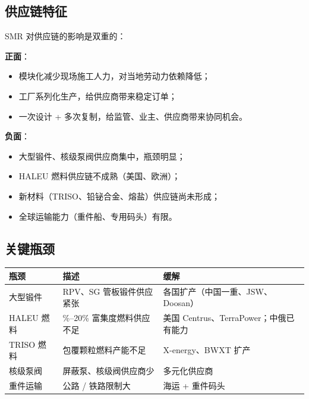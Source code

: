 \documentclass[
  UTF8,
  scheme=plain,
  fontsize=10pt,
  openany
]{ctexbook}
\begin{document}
\subsection{供应链特征}\label{ux4f9bux5e94ux94feux7279ux5f81}

SMR 对供应链的影响是双重的：

\textbf{正面}：

\begin{itemize}
\tightlist
\item
  模块化减少现场施工人力，对当地劳动力依赖降低；
\item
  工厂系列化生产，给供应商带来稳定订单；
\item
  一次设计 + 多次复制，给监管、业主、供应商带来协同机会。
\end{itemize}

\textbf{负面}：

\begin{itemize}
\tightlist
\item
  大型锻件、核级泵阀供应商集中，瓶颈明显；
\item
  HALEU 燃料供应链不成熟（美国、欧洲）；
\item
  新材料（TRISO、铅铋合金、熔盐）供应链尚未形成；
\item
  全球运输能力（重件船、专用码头）有限。
\end{itemize}

\subsection{关键瓶颈}\label{ux5173ux952eux74f6ux9888}

{\def\LTcaptype{none} %
\begin{longtable}[]{@{}
  >{\raggedright\arraybackslash}p{}
  >{\raggedright\arraybackslash}p{}
  >{\raggedright\arraybackslash}p{}@{}}
\toprule\noalign{}
\begin{minipage}[b]{\linewidth}\raggedright
瓶颈
\end{minipage} & \begin{minipage}[b]{\linewidth}\raggedright
描述
\end{minipage} & \begin{minipage}[b]{\linewidth}\raggedright
缓解
\end{minipage} \\
\midrule\noalign{}
\endhead
\bottomrule\noalign{}
\endlastfoot
大型锻件 & RPV、SG 管板锻件供应紧张 &
各国扩产（中国一重、JSW、Doosan） \\
HALEU 燃料 & 5\%--20\% 富集度燃料供应不足 & 美国
Centrus、TerraPower；中俄已有能力 \\
TRISO 燃料 & 包覆颗粒燃料产能不足 & X-energy、BWXT 扩产 \\
核级泵阀 & 屏蔽泵、核级阀供应商少 & 多元化供应商 \\
重件运输 & 公路 / 铁路限制大 & 海运 + 重件码头 \\
\end{longtable}
}
\end{document}
